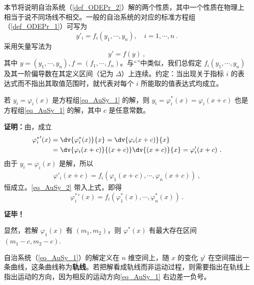 
本节将说明自治系统（\autoref{def_ODEPr_2}）解的两个性质，其中一个性质在物理上相当于说不同场线不相交。一般的自治系统的对应的标准方程组（\autoref{def_ODEPr_1}）可写为
\begin{equation}\label{eq_AuSy_1}
y'_i=f_i(y_1,\cdots,y_n),\quad i=1,\cdots,n~.
\end{equation}
采用矢量写法为
\begin{equation}\label{eq_AuSy_4}
y'=f(y)~,
\end{equation}
其中 $y=(y_1,\cdots,y_n),f=(f_1,\cdots,f_n)$。与“”中类似，我们总假定 $f_i(y_1,\cdots,y_n)$ 及其一阶偏导数在其定义区间（记为 $\Delta$）上连续。约定：当出现关于指标 $i$ 的表达式而不指出其取值范围时，就代表对每个 $i$ 所能取的值表达式均成立。

\begin{theorem}{}\label{the_AuSy_1}
若 $y_i=\varphi_i(x)$ 是方程组\autoref{eq_AuSy_1} 的解，则 $y_i=\varphi^*_i(x)=\varphi_i(x+c)$ 也是方程组\autoref{eq_AuSy_1} 的解，其中 $c$ 是任意常数。
\end{theorem}
\textbf{证明：}由，成立
\begin{equation}\label{eq_AuSy_2}
\begin{aligned}
{\varphi^*_i}'(x)&=\dv{\varphi^*_i(x)}{x}=\dv{\varphi_i(x+c)}{x}\\
&=\dv{\varphi_i(x+c)}{(x+c)}\dv{(x+c)}{x}=\varphi'_i(x+c)~.
\end{aligned}
\end{equation}
由于 $y_i=\varphi_i(x)$ 是解，所以
\begin{equation}
\begin{aligned}
\varphi'_i(x+c)=f_i(\varphi_1(x+c),\cdots,\varphi_n(x+c))~,
\end{aligned}
\end{equation}
恒成立。\autoref{eq_AuSy_2} 带入上式，即得
\begin{equation}
{\varphi^*_i}'(x)=f_i(\varphi^*_1(x),\cdots,\varphi^*_n(x))~.
\end{equation}

\textbf{证毕！}

显然，若解 $\varphi_1(x)$ 有 $(m_1,m_2)$，则 $\varphi^*(x)$ 有最大存在区间 $(m_1-c,m_2-c)$.

自治系统（\autoref{eq_AuSy_1}）的解定义在 $n$ 维空间上，随 $x$ 的变化 $y^i$ 在空间描出一条曲线，这条曲线称为\textbf{轨线}。若把解看成轨线而非运动过程，则需要指出在轨线上指出运动的方向，因为相反的运动方向\autoref{eq_AuSy_1} 右边差一负号。

